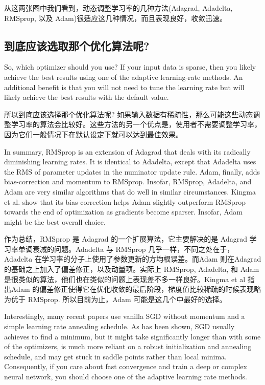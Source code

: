 \documentclass{article}
\begin{document}
从这两张图中我们看到，动态调整学习率的几种方法(Adagrad, Adadelta, RMSprop, 以及 Adam)很适应这几种情况，而且表现良好，收敛迅速。

\subsection{到底应该选取那个优化算法呢?}

So, which optimizer should you use? If your input data is sparse, then you likely achieve the best results using one of the adaptive learning-rate methods. An additional benefit is that you will not need to tune the learning rate but will likely achieve the best results with the default value.

所以到底应该选择那个优化算法呢? 如果输入数据有稀疏性，那么可能这些动态调整学习率的算法会比较好。这些方法的另一个优点是，使用者不需要调整学习率，因为它们一般情况下在默认设定下就可以达到最佳效果。

In summary, RMSprop is an extension of Adagrad that deals with its radically diminishing learning rates. It is identical to Adadelta, except that Adadelta uses the RMS of parameter updates in the numinator update rule. Adam, finally, adds bias-correction and momentum to RMSprop. Insofar, RMSprop, Adadelta, and Adam are very similar algorithms that do well in similar circumstances. Kingma et al. \cite{Kingma2015} show that its bias-correction helps Adam slightly outperform RMSprop towards the end of optimization as gradients become sparser. Insofar, Adam might be the best overall choice.

作为总结，RMSprop 是 Adagrad 的一个扩展算法，它主要解决的是 Adagrad 学习率单调衰减的问题。Adadelta 与 RMSprop 几乎一样，不同之处在于，Adadelta 在学习率的分子上使用了参数更新的方均根误差。而Adam 则在Adagrad的基础之上加入了偏差修正，以及动量项。实际上 RMSprop, Adadelta, 和 Adam 是很类似的算法，他们也在类似的问题上表现差不多一样良好。Kingma et al \cite{Kingma2015} 指出Adam 的偏差修正使得它在优化收敛的最后阶段，梯度值比较稀疏的时候表现略为优于 RMSprop. 所以目前为止，Adam 可能是这几个中最好的选择。

Interestingly, many recent papers use vanilla SGD without momentum and a simple learning rate annealing schedule. As has been shown, SGD usually achieves to find a minimum, but it might take significantly longer than with some of the optimizers, is much more reliant on a robust initialization and annealing schedule, and may get stuck in saddle points rather than local minima. Consequently, if you care about fast convergence and train a deep or complex neural network, you should choose one of the adaptive learning rate methods.
\end{document}
